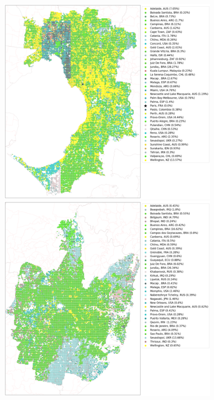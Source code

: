 \documentclass[sageh,times]{sagej}
\begin{document}

\begin{figure}[!htbp]
\centering    
\includegraphics[scale=0.16]{Images/MelbourneOverallAbrev_sat.png} 
\includegraphics[scale=0.16]{Images/SydneyOverallAbrev_sat.png} 

\end{figure}
\end{document}
